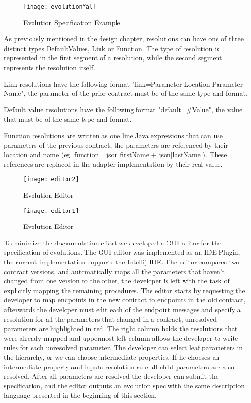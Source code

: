 \begin{figure}[htbp]
    \centering
    \texttt{[image: evolutionYal]}
    \caption{Evolution Specification Example}
    \label{fig:evolution_yal}
\end{figure}

As previously mentioned in the design chapter, resolutions can have one of three distinct types
DefaultValues, Link or Function.
The type of resolution is represented in the first segment of a resolution, while the second segment represents the resolution itself.

Link resolutions have the following format "link={Parameter Location}|{Parameter Name}", the parameter of the prior contract must be of the same type and format.

Default value resolutions have the following format "default=#Value", the value that must be of the same type and format.

Function resolutions are written as one line Java expressions that can use parameters of the previous contract, the
parameters are referenced by their location and name (eg. function= {{json|firstName}} + {{json|lastName}} ).
These references are replaced in the adapter implementation by their real value.

\newpage

\begin{figure}[htbp]
    \centering
    \texttt{[image: editor2]}
    \caption{Evolution Editor}
    \label{fig:editor2}
\end{figure}

\begin{figure}[htbp]
    \centering
    \texttt{[image: editor1]}
    \caption{Evolution Editor}
    \label{fig:editor1}
\end{figure}

To minimize the documentation effort we developed a GUI editor for the specification of evolutions.
The GUI editor was implemented as an IDE Plugin, the current implementation supports the Intellij IDE.
The editor compares two contract versions,
and automatically maps all the parameters that haven't changed from one version to the other, the
developer is left with the task of explicitly mapping the remaining procedures.
The editor starts by requesting the developer to map endpoints in the new contract to endpoints in the old contract,
afterwards the developer must edit each of the endpoint messages and specify a resolution for all the parameters that changed
in a contract, unresolved parameters are highlighted in red.
The right column holds the resolutions that were already mapped and uppermost left column allows the developer to write rules
for each unresolved parameter.
The developer can select leaf parameters in the hierarchy, or we can choose intermediate properties.
If he chooses an intermediate property and inputs resolution rule all child parameters are also resolved.
After all parameters are resolved the developer can submit the specification, and
the editor outputs an evolution spec with the same description language presented in the beginning of this section.


